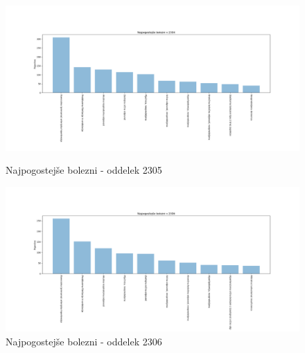 \documentclass[a4paper,12pt]{report}
\begin{document}
\begin{center}
   \begin{figure}[!htb]
      \centering
         \begin{minipage}[b]{0.4\textwidth}
            \noindent\includegraphics[width=\linewidth]{./grafi/2304.png}
            \caption{Najpogostejše bolezni - oddelek 2305}
         \end{minipage}
         \hfill
         \begin{minipage}[b]{0.4\textwidth}
            \noindent\includegraphics[width=\linewidth]{./grafi/2306.png}
            \caption{Najpogostejše bolezni - oddelek 2306}
         \end{minipage}
   \end{figure}


\end{center}
\end{document}
